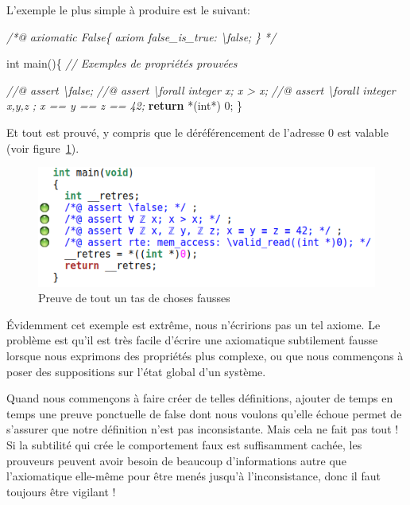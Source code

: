 \documentclass[12pt,francais,]{scrbook}
\newenvironment{Shaded}{}{}
\newcommand{\KeywordTok}[1]{\textcolor[rgb]{0.00,0.44,0.13}{\textbf{{#1}}}}
\newcommand{\DataTypeTok}[1]{\textcolor[rgb]{0.56,0.13,0.00}{{#1}}}
\newcommand{\DecValTok}[1]{\textcolor[rgb]{0.25,0.63,0.44}{{#1}}}
\newcommand{\CommentTok}[1]{\textcolor[rgb]{0.38,0.63,0.69}{\textit{{#1}}}}
\newcommand{\NormalTok}[1]{{#1}}
\begin{document}
L'exemple le plus simple à produire est le suivant:

\begin{footnotesize}\begin{Shaded}
\begin{Highlighting}[]
\CommentTok{/*@}
\CommentTok{  axiomatic False\{}
\CommentTok{    axiom false_is_true: \textbackslash{}false;}
\CommentTok{  \}}
\CommentTok{*/}

\DataTypeTok{int} \NormalTok{main()\{}
  \CommentTok{// Exemples de propriétés prouvées}

  \CommentTok{//@ assert \textbackslash{}false;}
  \CommentTok{//@ assert \textbackslash{}forall integer x; x > x;}
  \CommentTok{//@ assert \textbackslash{}forall integer x,y,z ; x == y == z == 42;}
  \KeywordTok{return} \NormalTok{*(}\DataTypeTok{int}\NormalTok{*) }\DecValTok{0}\NormalTok{;}
\NormalTok{\}}
\end{Highlighting}
\end{Shaded}\end{footnotesize}

Et tout est prouvé, y compris que le déréférencement de l'adresse 0 est
valable (voir figure~\ref{fig:false-axiom}).

\begin{figure}[htbp]
\centering
\includegraphics[scale=0.5]{false_axiom.png}
\caption{Preuve de tout un tas de choses fausses}
\label{fig:false-axiom}
\end{figure}

Évidemment cet exemple est extrême, nous n'écririons pas un tel axiome.
Le problème est qu'il est très facile d'écrire une axiomatique
subtilement fausse lorsque nous exprimons des propriétés plus complexe,
ou que nous commençons à poser des suppositions sur l'état global d'un
système.

Quand nous commençons à faire créer de telles définitions, ajouter de
temps en temps une preuve ponctuelle de \og{}false\fg{} dont nous voulons
qu'elle échoue permet de s'assurer que notre définition n'est pas
inconsistante. Mais cela ne fait pas tout ! Si la subtilité qui crée le
comportement faux est suffisamment cachée, les prouveurs peuvent avoir
besoin de beaucoup d'informations autre que l'axiomatique elle-même pour
être menés jusqu'à l'inconsistance, donc il faut toujours être vigilant
!
\end{document}
